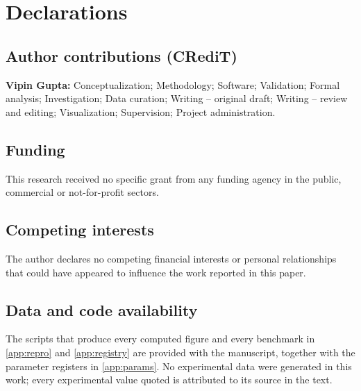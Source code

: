 
\section*{Declarations}\label{sec:declarations}

\subsection*{Author contributions (CRediT)}
\textbf{Vipin Gupta:} Conceptualization; Methodology; Software; Validation; Formal analysis;
Investigation; Data curation; Writing -- original draft; Writing -- review and editing;
Visualization; Supervision; Project administration.

\subsection*{Funding}
This research received no specific grant from any funding agency in the public, commercial or
not-for-profit sectors.

\subsection*{Competing interests}
The author declares no competing financial interests or personal relationships that could have
appeared to influence the work reported in this paper.

\subsection*{Data and code availability}
The scripts that produce every computed figure and every benchmark in \cref{app:repro} and
\cref{app:registry} are provided with the manuscript, together with the parameter registers in
\cref{app:params}. No experimental data were generated in this work; every experimental value quoted is
attributed to its source in the text.

